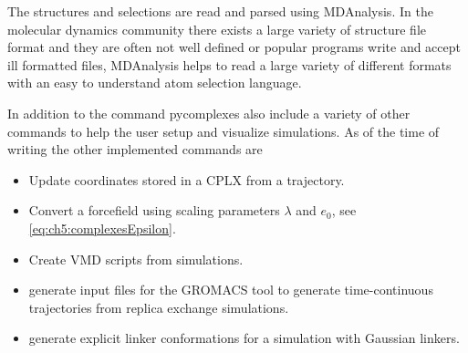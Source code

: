 \documentclass[12pt, twoside]{report}
\begin{document}
The structures and selections are read and parsed using
MDAnalysis\cite{oliver_beckstein-proc-scipy-2016, Michaud-agrawal2011}. In the
molecular dynamics community there exists a large variety of structure file
format and they are often not well defined or popular programs write and accept
ill formatted files, MDAnalysis helps to read a large variety of different
formats with an easy to understand atom selection language.

In addition to the  command pycomplexes also include a
variety of other commands to help the user setup and visualize simulations. As
of the time of writing the other implemented commands are
\begin{itemize}
  \item {} Update coordinates stored in a CPLX from a
trajectory.
  \item {} Convert a forcefield using scaling parameters
\(\lambda\) and \(e_0\), see \cref{eq:ch5:complexesEpsilon}.
  \item {} Create VMD scripts from simulations.
  \item {} generate input files for the GROMACS tool
 to generate time-continuous trajectories from replica
exchange simulations.
  \item {} generate explicit linker conformations for a
simulation with Gaussian linkers.
\end{itemize}



\clearpage
{}

\clearpage
\printglossary[type=\acronymtype,title=List of Abbreviations]
\end{document}
